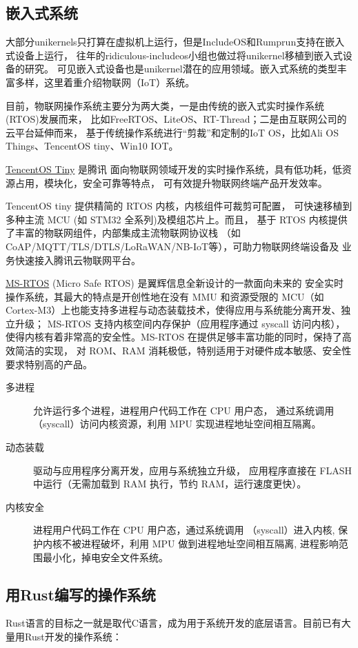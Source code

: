 \documentclass{../runikraft-report}
\begin{document}
\subsection{嵌入式系统}
大部分unikernels只打算在虚拟机上运行，但是IncludeOS和Rumprun支持在嵌入式设备上运行，
往年的ridiculous-includeos小组也做过将unikernel移植到嵌入式设备的研究。
可见嵌入式设备也是unikernel潜在的应用领域。嵌入式系统的类型丰富多样，这里着重介绍物联网（IoT）系统。

目前，物联网操作系统主要分为两大类，一是由传统的嵌入式实时操作系统(RTOS)发展而来，
比如FreeRTOS、LiteOS、RT-Thread；二是由互联网公司的云平台延伸而来，
基于传统操作系统进行“剪裁”和定制的IoT OS，比如Ali OS Things、TencentOS tiny、Win10 IOT。\cite{bib:iot-sys}

\href{https://github.com/OpenAtomFoundation/TencentOS-tiny}{TencentOS Tiny} 是腾讯
面向物联网领域开发的实时操作系统，具有低功耗，低资源占用，模块化，安全可靠等特点，
可有效提升物联网终端产品开发效率。

TencentOS tiny 提供精简的 RTOS 内核，内核组件可裁剪可配置，
可快速移植到多种主流 MCU (如 STM32 全系列)及模组芯片上。而且，
基于 RTOS 内核提供了丰富的物联网组件，内部集成主流物联网协议栈
（如CoAP/MQTT/TLS/DTLS/LoRaWAN/NB-IoT等），可助力物联网终端设备及
业务快速接入腾讯云物联网平台。

\href{https://github.com/ms-rtos}{MS-RTOS} (Micro Safe RTOS) 是翼辉信息全新设计的一款面向未来的
安全实时操作系统，其最大的特点是开创性地在没有 MMU 和资源受限的 MCU（如Cortex-M3）上也能支持多进程与动态装载技术，使得应用与系统能分离开发、独立升级；
MS-RTOS 支持内核空间内存保护（应用程序通过 syscall 访问内核），
使得内核有着非常高的安全性。MS-RTOS 在提供足够丰富功能的同时，保持了高效简洁的实现，
对 ROM、RAM 消耗极低，特别适用于对硬件成本敏感、安全性要求特别高的产品。\cite{bib:ms-rtos}

\begin{description}
\item[多进程] 允许运行多个进程，进程用户代码工作在 CPU 用户态，
通过系统调用（syscall）访问内核资源，利用 MPU 实现进程地址空间相互隔离。
\item[动态装载] 驱动与应用程序分离开发，应用与系统独立升级，
应用程序直接在 FLASH 中运行（无需加载到 RAM 执行，节约 RAM，运行速度更快）。
\item[内核安全] 进程用户代码工作在 CPU 用户态，通过系统调用
（syscall）进入内核, 保护内核不被进程破坏，利用 MPU 做到进程地址空间相互隔离,
进程影响范围最小化，掉电安全文件系统。
\end{description}
\subsection{用Rust编写的操作系统}
Rust语言的目标之一就是取代C语言，成为用于系统开发的底层语言。目前已有大量用Rust开发的操作系统：\cite{bib:rust-os-comparison}
\end{document}
